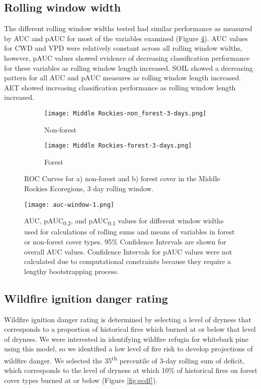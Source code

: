 \documentclass[11p]{article}
\newcommand{\pauc}[1]{pAUC\textsubscript{#1}}
\begin{document}
\begin{table}
{\subsection{Rolling window width}

The different rolling window widths tested had similar performance as measured by AUC and pAUC for most of the variables examined (Figure \ref{fig:auc_window}). AUC values for CWD and VPD were relatively constant across all rolling window widths, however, pAUC values showed evidence of decreasing classification performance for these variables as rolling window length increased. SOIL showed a decreasing pattern for all AUC and pAUC measures as rolling window length increased. AET showed increasing classification performance as rolling window length increased.  


\begin{figure}[htbp]
  \centering
  \begin{subfigure}{.5\textwidth}
    \centering
    \texttt{[image: Middle Rockies-non\_forest-3-days.png]}
    \caption{Non-forest}
    \label{fig:mr-nf-auc}
  \end{subfigure}%
  \begin{subfigure}{.5\textwidth}
    \centering
    \texttt{[image: Middle Rockies-forest-3-days.png]}
    \caption{Forest}
    \label{fig:mr-f-auc}
  \end{subfigure}
  \caption{ROC Curves for a) non-forest and b) forest cover in the Middle Rockies Ecoregions, 3 day rolling window.}
  \label{fig:auc}
\end{figure}

\begin{figure}[htbp]
  \centering
  \texttt{[image: auc-window-1.png]}
  \caption{AUC, \pauc{0.2}, and \pauc{0.1} values for different window widths used for calculations of rolling sums and means of variables in forest or non-forest cover types. 95\% Confidence Intervals are shown for overall AUC values. Confidence Intervals for pAUC values were not calculated due to computational constraints because they require a lengthy bootstrapping process.}
  \label{fig:auc_window}
\end{figure}

\subsection{Wildfire ignition danger rating}

Wildfire ignition danger rating is determined by selecting a level of dryness that corresponds to a proportion of historical fires which burned at or below that level of dryness. We were interested in identifying wildfire refugia for whitebark pine using this model, so we identified a low level of fire risk to develop projections of wildfire danger. We selected the 35\textsuperscript{th} percentile of 3-day rolling sum of deficit, which corresponds to the level of dryness at which 10\% of historical fires on forest cover types burned at or below (Figure \ref{fig:ecdf}).

}
\end{table}
\end{document}
